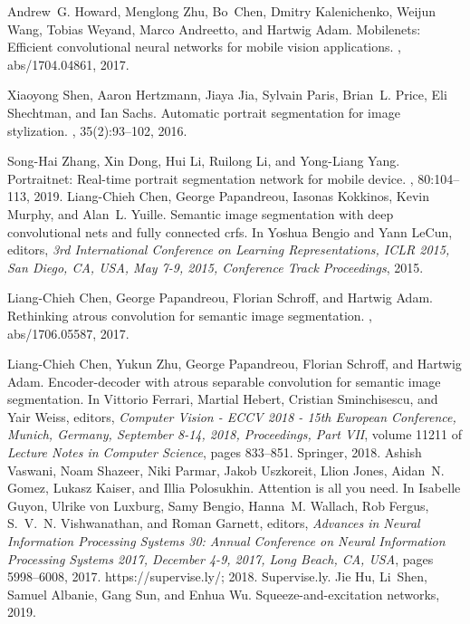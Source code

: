 \documentclass[11pt]{article}
\begin{document}
\begin{thebibliography}{99}
Andrew~G. Howard, Menglong Zhu, Bo~Chen, Dmitry Kalenichenko, Weijun Wang,
  Tobias Weyand, Marco Andreetto, and Hartwig Adam.
\newblock Mobilenets: Efficient convolutional neural networks for mobile vision
  applications.
, abs/1704.04861, 2017.

Xiaoyong Shen, Aaron Hertzmann, Jiaya Jia, Sylvain Paris, Brian~L. Price, Eli
  Shechtman, and Ian Sachs.
\newblock Automatic portrait segmentation for image stylization.
, 35(2):93--102, 2016.

Song{-}Hai Zhang, Xin Dong, Hui Li, Ruilong Li, and Yong{-}Liang Yang.
\newblock Portraitnet: Real-time portrait segmentation network for mobile
  device.
, 80:104--113, 2019.
Liang{-}Chieh Chen, George Papandreou, Iasonas Kokkinos, Kevin Murphy, and
  Alan~L. Yuille.
\newblock Semantic image segmentation with deep convolutional nets and fully
  connected crfs.
\newblock In Yoshua Bengio and Yann LeCun, editors, {\em 3rd International
  Conference on Learning Representations, {ICLR} 2015, San Diego, CA, USA, May
  7-9, 2015, Conference Track Proceedings}, 2015.

Liang{-}Chieh Chen, George Papandreou, Florian Schroff, and Hartwig Adam.
\newblock Rethinking atrous convolution for semantic image segmentation.
, abs/1706.05587, 2017.

Liang{-}Chieh Chen, Yukun Zhu, George Papandreou, Florian Schroff, and Hartwig
  Adam.
\newblock Encoder-decoder with atrous separable convolution for semantic image
  segmentation.
\newblock In Vittorio Ferrari, Martial Hebert, Cristian Sminchisescu, and Yair
  Weiss, editors, {\em Computer Vision - {ECCV} 2018 - 15th European
  Conference, Munich, Germany, September 8-14, 2018, Proceedings, Part {VII}},
  volume 11211 of {\em Lecture Notes in Computer Science}, pages 833--851.
  Springer, 2018.
Ashish Vaswani, Noam Shazeer, Niki Parmar, Jakob Uszkoreit, Llion Jones,
  Aidan~N. Gomez, Lukasz Kaiser, and Illia Polosukhin.
\newblock Attention is all you need.
\newblock In Isabelle Guyon, Ulrike von Luxburg, Samy Bengio, Hanna~M. Wallach,
  Rob Fergus, S.~V.~N. Vishwanathan, and Roman Garnett, editors, {\em Advances
  in Neural Information Processing Systems 30: Annual Conference on Neural
  Information Processing Systems 2017, December 4-9, 2017, Long Beach, CA,
  {USA}}, pages 5998--6008, 2017.
 https://supervise.ly/; 2018.
\newblock Supervise.ly.
Jie Hu, Li~Shen, Samuel Albanie, Gang Sun, and Enhua Wu.
\newblock Squeeze-and-excitation networks, 2019.
\end{thebibliography}
\end{document}
